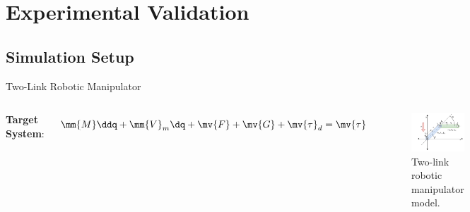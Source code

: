 \documentclass[8pt, aspectratio=169, handout]{beamer}
\begin{document}
\section{Experimental Validation}

\subsection{Simulation Setup}

\begin{frame}{\insertsubsectionhead}{Two-Link Robotic Manipulator}

    \begin{columns}


        \textbf{Target System}:

        \begin{equation*}
          \mm{M}\ddq + \mm{V}_m\dq + \mv{F} + \mv{G} + \mv{\tau}_d
          =
          \mv{\tau}
        \end{equation*}

        \begin{figure}
          \centering
          \includegraphics[width=.99\textwidth]{figures/RobotModel.drawio.png}
          \caption{Two-link robotic manipulator model.}
        \end{figure}

      

\end{columns}
\end{frame}
\end{document}
